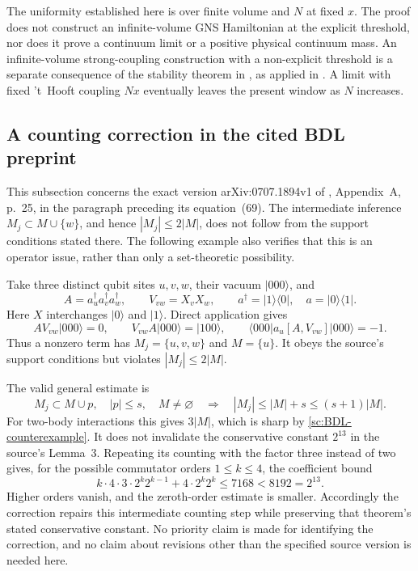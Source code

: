 \begin{remark}
\label{sc:scope}
The uniformity established here is over finite volume and $N$ at
fixed $x$. The proof does not construct an infinite-volume GNS
Hamiltonian at the explicit threshold, nor does it prove a continuum
limit or a positive physical continuum mass. An infinite-volume
strong-coupling construction with a non-explicit threshold is a
separate consequence of the stability theorem in \cite{Yarotsky},
as applied in \cite{Spectral}. A limit with fixed 't~Hooft coupling
$Nx$ eventually leaves the present window as $N$ increases.
\end{remark}

\subsection{A counting correction in the cited BDL preprint}
\label{sc:BDL-correction}

This subsection concerns the exact version
arXiv:0707.1894v1 of \cite{BDL}, Appendix~A, p.~25, in the
paragraph preceding its equation~(69). The intermediate inference
$M_j\subset M\cup\{w\}$, and hence $|M_j|\le2|M|$, does not
follow from the support conditions stated there. The following
example also verifies that this is an operator issue, rather than
only a set-theoretic possibility.

Take three distinct qubit sites $u,v,w$, their vacuum $|000\rangle$,
and
\[
 A=a_u^\dagger a_v^\dagger a_w^\dagger,
 \qquad V_{vw}=X_vX_w,
 \qquad a^\dagger=|1\rangle\langle0|,
 \quad a=|0\rangle\langle1|.
\]
Here $X$ interchanges $|0\rangle$ and $|1\rangle$.
Direct application gives
\begin{equation}
 AV_{vw}|000\rangle=0,\qquad
 V_{vw}A|000\rangle=|100\rangle,\qquad
 \langle000|a_u[A,V_{vw}]|000\rangle=-1.
 \label{sc:BDL-counterexample}
\end{equation}
Thus a nonzero term has $M_j=\{u,v,w\}$ and $M=\{u\}$.
It obeys the source's support conditions but violates
$|M_j|\le2|M|$.

The valid general estimate is
\begin{equation}
 M_j\subset M\cup p,\quad |p|\le s,\quad M\ne\varnothing
 \quad\Longrightarrow\quad
 |M_j|\le|M|+s\le(s+1)|M|.
 \label{sc:corrected-count}
\end{equation}
For two-body interactions this gives $3|M|$, which is sharp by
\eqref{sc:BDL-counterexample}. It does not invalidate the conservative
constant $2^{13}$ in the source's Lemma~3. Repeating its counting
with the factor three instead of two gives, for the possible
commutator orders $1\le k\le4$, the coefficient bound
\begin{equation}
 k\cdot4\cdot3\cdot2^k2^{k-1}
        +4\cdot2^k2^k
 \le7168<8192=2^{13}.
 \label{sc:BDL-constant-survives}
\end{equation}
Higher orders vanish, and the zeroth-order estimate is smaller.
Accordingly the correction repairs this intermediate counting step
while preserving that theorem's stated conservative constant.
No priority claim is made for identifying the correction, and no
claim about revisions other than the specified source version is
needed here.
